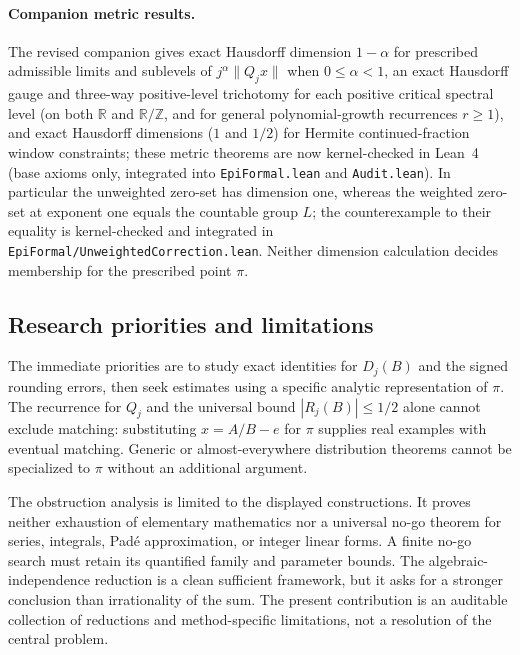 \documentclass[11pt]{amsart}
\theoremstyle{definition}
\theoremstyle{remark}
\numberwithin{equation}{section}
\newcommand{\R}{\mathbb{R}}
\newcommand{\Z}{\mathbb{Z}}
\begin{document}
\paragraph{Companion metric results.} The revised companion
\cite{CompanionGauge} gives exact Hausdorff dimension $1-\alpha$ for
prescribed admissible limits and sublevels of $j^\alpha\|Q_jx\|$ when
$0\le\alpha<1$, an exact Hausdorff gauge and three-way positive-level
trichotomy for each positive critical spectral level (on both $\R$ and
$\R/\Z$, and for general polynomial-growth recurrences $r\ge1$), and
exact Hausdorff dimensions ($1$ and $1/2$) for Hermite continued-fraction
window constraints; these metric theorems are now kernel-checked in
Lean~4 (base axioms only, integrated into \texttt{EpiFormal.lean} and
\texttt{Audit.lean}). In particular the unweighted zero-set has
dimension one, whereas the weighted zero-set at exponent one
equals the countable group $L$; the counterexample to their
equality is kernel-checked and integrated in
\texttt{EpiFormal/UnweightedCorrection.lean}. Neither dimension
calculation decides membership for the prescribed point $\pi$.
\subsection{Research priorities and limitations}

The immediate priorities are to study exact identities for $D_j(B)$ and the signed rounding errors, then seek estimates using a specific analytic representation of $\pi$. The recurrence for $Q_j$ and the universal bound $|R_j(B)|\le1/2$ alone cannot exclude matching: substituting $x=A/B-e$ for $\pi$ supplies real examples with eventual matching. Generic or almost-everywhere distribution theorems cannot be specialized to $\pi$ without an additional argument.

The obstruction analysis is limited to the displayed constructions. It proves neither exhaustion of elementary mathematics nor a universal no-go theorem for series, integrals, Pad\'e approximation, or integer linear forms. A finite no-go search must retain its quantified family and parameter bounds. The algebraic-independence reduction is a clean sufficient framework, but it asks for a stronger conclusion than irrationality of the sum. The present contribution is an auditable collection of reductions and method-specific limitations, not a resolution of the central problem.
\end{document}
